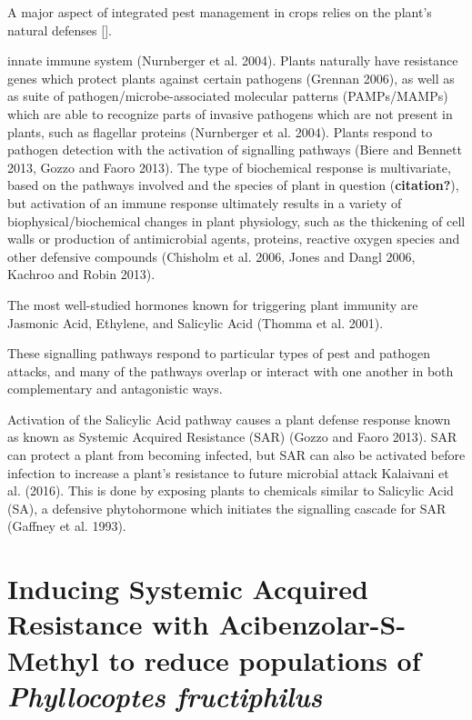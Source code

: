 \documentclass[12pt,final,CPage]{ufthesis}
\begin{document}
{  A major aspect of integrated pest management in crops relies on the plant's natural defenses {[}{]}.

  innate immune system (Nurnberger et al. 2004). Plants naturally have resistance genes which protect plants against certain pathogens (Grennan 2006), as well as as suite of pathogen/microbe-associated molecular patterns (PAMPs/MAMPs) which are able to recognize parts of invasive pathogens which are not present in plants, such as flagellar proteins (Nurnberger et al. 2004). Plants respond to pathogen detection with the activation of signalling pathways (Biere and Bennett 2013, Gozzo and Faoro 2013). The type of biochemical response is multivariate, based on the pathways involved and the species of plant in question (\textbf{citation?}), but activation of an immune response ultimately results in a variety of biophysical/biochemical changes in plant physiology, such as the thickening of cell walls or production of antimicrobial agents, proteins, reactive oxygen species and other defensive compounds (Chisholm et al. 2006, Jones and Dangl 2006, Kachroo and Robin 2013).

  The most well-studied hormones known for triggering plant immunity are Jasmonic Acid, Ethylene, and Salicylic Acid (Thomma et al. 2001).

  These signalling pathways respond to particular types of pest and pathogen attacks, and many of the pathways overlap or interact with one another in both complementary and antagonistic ways.

  Activation of the Salicylic Acid pathway causes a plant defense response known as known as Systemic Acquired Resistance (SAR) (Gozzo and Faoro 2013). SAR can protect a plant from becoming infected, but SAR can also be activated before infection to increase a plant's resistance to future microbial attack Kalaivani et al. (2016). This is done by exposing plants to chemicals similar to Salicylic Acid (SA), a defensive phytohormone which initiates the signalling cascade for SAR (Gaffney et al. 1993).

  \hypertarget{ipm-actigard}{%
  \section{\texorpdfstring{Inducing Systemic Acquired Resistance with Acibenzolar-S-Methyl to reduce populations of \emph{Phyllocoptes fructiphilus}}{Inducing Systemic Acquired Resistance with Acibenzolar-S-Methyl to reduce populations of Phyllocoptes fructiphilus}}\label{ipm-actigard}}

}
\end{document}
